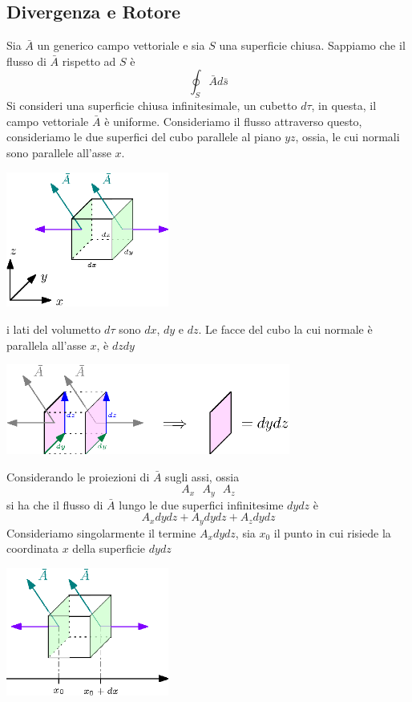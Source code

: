 \documentclass[10pt, letterpaper]{report}
\begin{document}
\subsection{Divergenza e Rotore}
Sia $\bar A$ un generico campo vettoriale e sia $S$ una superficie chiusa. Sappiamo che il flusso di $\bar A$ rispetto ad $S$ è
$$\oint_S \bar A d\bar s $$ 
Si consideri una superficie chiusa infinitesimale, un cubetto $d\tau$, in questa, il campo vettoriale $\bar A$ è uniforme. Consideriamo il flusso attraverso questo, consideriamo le due superfici del cubo parallele al piano $yz$, ossia, le cui normali sono parallele all'asse $x$.\begin{center}
    \includegraphics[width=0.4\textwidth]{images/Cubetto.eps}
\end{center}
i lati del volumetto $d\tau$ sono $dx$, $dy$ e $dz$. Le facce del cubo la cui normale è parallela all'asse $x$, è $dzdy$\begin{center}
    \includegraphics[width=0.7\textwidth]{images/Cubetto2.eps}
\end{center}
Considerando le proiezioni di $\bar A$ sugli assi, ossia $$ A_x \ \ \ A_y \ \ \ A_z$$
si ha che il flusso di $\bar A$ lungo le due superfici infinitesime $dydz$ è 
$$ A_xdydz+A_ydydz+A_zdydz$$
Consideriamo singolarmente il termine $A_xdydz$, sia $x_0$ il punto in cui risiede la coordinata $x$ della superficie $dydz$\begin{center}
    \includegraphics[width=0.4\textwidth]{images/Cubetto3.eps}
\end{center}
\end{document}
